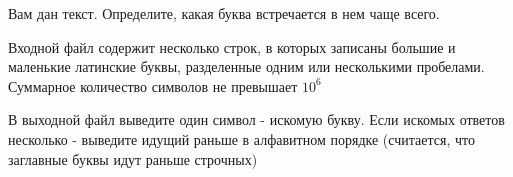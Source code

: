 Вам дан текст. Определите, какая буква встречается в нем чаще всего.

\InputFile
Входной файл содержит несколько строк, в которых записаны большие и маленькие латинские буквы, разделенные
одним или несколькими пробелами. Суммарное количество символов не превышает $10^6$

\OutputFile
В выходной файл выведите один символ - искомую букву.
Если искомых ответов несколько - выведите идущий раньше в алфавитном порядке 
(считается, что заглавные буквы идут раньше строчных)


